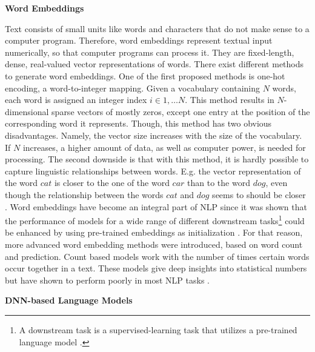  
\textbf{Word Embeddings}
\label{sec:word_embeddings}

Text consists of small units like words and characters that do not make sense to a computer program. Therefore, word embeddings represent textual input numerically, so that computer programs can process it. They are fixed-length, dense, real-valued vector representations of words.
There exist different methods to generate word embeddings. One of the first proposed methods is one-hot encoding, a word-to-integer mapping. Given a vocabulary containing $N$ words, each word is assigned an integer index $i \in {1, \dots N}$. 
This method results in $N$-dimensional sparse vectors of mostly zeros, except one entry at the position of the corresponding word it represents. Though, this method has two obvious disadvantages. Namely, the vector size increases with the size of the vocabulary. If $N$ increases, a higher amount of data, as well as computer power, is needed for processing. The second downside is that with this method, it is hardly possible to capture linguistic relationships between words. E.g. the vector representation of the word $cat$ is closer to the one of the word $car$ than to the word $dog$, even though the relationship between the words $cat$ and $dog$ seems to should be closer \cite{rodriguez2018beyond}.
Word embeddings have become an integral part of NLP since it was shown that the performance of models for a wide range of different downstream tasks\footnote{A downstream task is a supervised-learning task that utilizes a pre-trained language model \cite{alammar2018illustrated}.} could be enhanced by using pre-trained embeddings as initialization \cite{mikolov2013efficient, pennington2014glove}. 
For that reason, more advanced word embedding methods were introduced, based on word count and prediction. Count based models work with the number of times certain words occur together in a text. These models give deep insights into statistical numbers but have shown to perform poorly in most NLP tasks \cite{neubig2016generalizing}.

 
\textbf{DNN-based Language Models}
\label{sec:DNN-based_Language_models}

